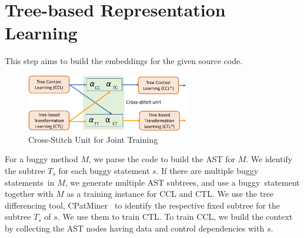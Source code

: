 \section{Tree-based Representation Learning}



This step aims to build the embeddings for the given source code.

\begin{figure}[t]
	\centering
	\includegraphics[width=2.8in]{graphs/cross-stitch}
        \vspace{-6pt}
	\caption{Cross-Stitch Unit for Joint Training~\cite{misra2016cross}}
	\label{fig:cross-stitch}
\end{figure}



For a buggy method $M$, we parse the code to build the AST for
$M$. We identify the subtree $T_s$ for each buggy
statement $s$. If there are multiple buggy statements~in $M$, we
generate multiple AST subtrees, and use a buggy~statement
together with $M$ as a training instance for CCL and CTL.
We use the tree differencing tool, CPatMiner~\cite{nguyen2019graph} to
identify the respective fixed subtree for the subtree $T_s$ of $s$. We
use them to train CTL. To train CCL, we build the context by
collecting the AST nodes having data and control dependencies with
$s$.


